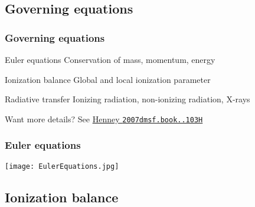 \documentclass[presentation]{beamer}
\begin{document}
\subsection{Governing equations}
\begin{frame}
  \frametitle{Governing equations}
  \begin{block}{Euler equations}
    Conservation of mass, \alert{momentum}, energy
  \end{block}
  \begin{block}{Ionization balance}
    Global and local ionization parameter
  \end{block}
  \begin{block}{Radiative transfer}
    \alert{Ionizing radiation}, non-ionizing radiation, X-rays
  \end{block}
  \begin{block}{Want more details?}
    See \href{http://adsabs.harvard.edu/abs/2007dmsf.book..103H}{Henney \texttt{2007dmsf.book..103H}}
  \end{block}
\end{frame}



\begin{frame}
  \frametitle{Euler equations}
  \begin{centering}
    \texttt{[image: EulerEquations.jpg]}\par
  \note{
    \[
    \frac{d}{dt} ( \rho \VEC{u} ) + \VEC{\grad} ( P + \rho u^2 ) = \rho \VEC{a} 
    \]
  }
  \end{centering}
\end{frame}

\subsection{Ionization balance}
\end{document}
